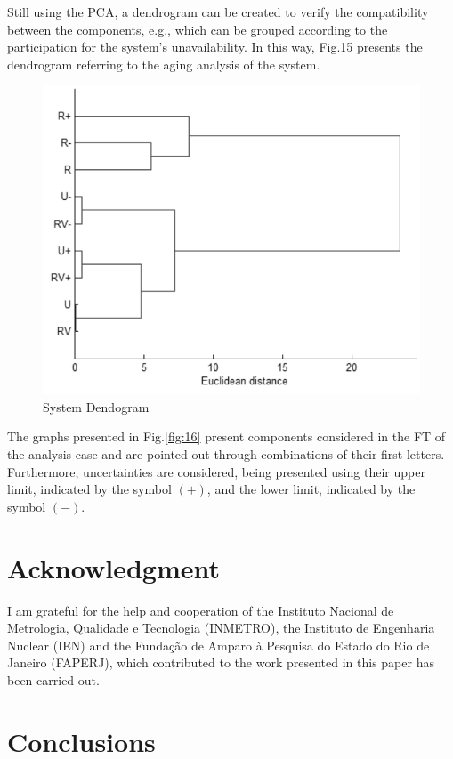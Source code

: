 \documentclass{ws-m3as}
\begin{document}
Still using the PCA, a dendrogram can be created to verify the compatibility between the components, e.g., which can be grouped according to the participation for the system's unavailability. In this way, Fig.15 presents the dendrogram referring to the aging analysis of the system.

\begin{figure} [H]
	\centering
	\includegraphics[width=1\linewidth]{Figures/FVDendogram}
	\caption{System Dendogram}
	\label{fig:fvdendogram}
	\label{fig:17}
\end{figure}

The graphs presented in Fig.\ref{fig:16} present components considered in the FT of the analysis case and are pointed out through combinations of their first letters. Furthermore, uncertainties are considered, being presented using their upper limit, indicated by the symbol $(+)$, and the lower limit, indicated by the symbol $(-)$.
	
\section{Acknowledgment}

I am grateful for the help and cooperation of the Instituto Nacional de Metrologia, Qualidade e Tecnologia (INMETRO), the Instituto de Engenharia Nuclear (IEN) and the Fundação de Amparo à Pesquisa do Estado do Rio de Janeiro (FAPERJ), which contributed to the work presented in this paper has been carried out.

\section{Conclusions}
\end{document}
